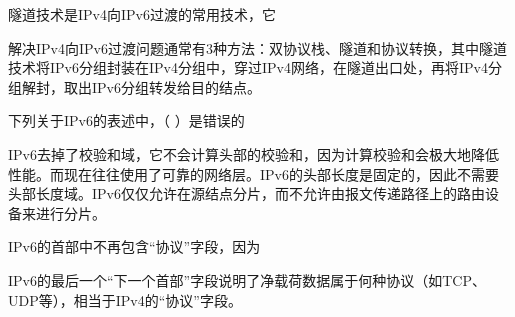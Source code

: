 \question 隧道技术是IPv4向IPv6过渡的常用技术，它
\par{}
\begin{solution}解决IPv4向IPv6过渡问题通常有3种方法：双协议栈、隧道和协议转换，其中隧道技术将IPv6分组封装在IPv4分组中，穿过IPv4网络，在隧道出口处，再将IPv4分组解封，取出IPv6分组转发给目的结点。
\end{solution}
\question 下列关于IPv6的表述中，（ ）是错误的
\par{}
\begin{solution}IPv6去掉了校验和域，它不会计算头部的校验和，因为计算校验和会极大地降低性能。而现在往往使用了可靠的网络层。IPv6的头部长度是固定的，因此不需要头部长度域。IPv6仅仅允许在源结点分片，而不允许由报文传递路径上的路由设备来进行分片。
\end{solution}
\question IPv6的首部中不再包含``协议''字段，因为
\par{}
\begin{solution}IPv6的最后一个``下一个首部''字段说明了净载荷数据属于何种协议（如TCP、UDP等），相当于IPv4的``协议''字段。
\end{solution}
